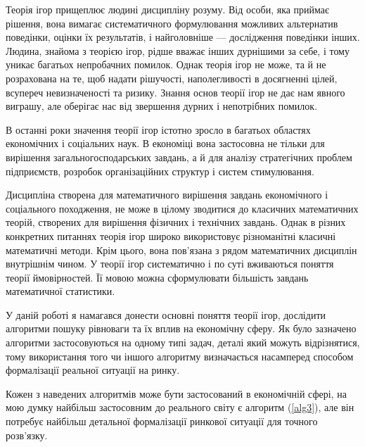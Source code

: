 \documentclass[a4paper]{article}
\begin{document}
Теорія ігор прищеплює людині дисципліну розуму. Від особи, яка приймає рішення, вона вимагає систематичного формулювання можливих альтернатив поведінки, оцінки їх результатів, і найголовніше — дослідження поведінки інших. Людина, знайома з теорією ігор, рідше вважає інших дурнішими за себе, і тому уникає багатьох непробачних помилок. Однак теорія ігор не може, та й не розрахована на те, щоб надати рішучості, наполегливості в досягненні цілей, всупереч невизначеності та ризику. Знання основ теорії ігор не дає нам явного виграшу, але оберігає нас від звершення дурних і непотрібних помилок.

В останні роки значення теорії ігор істотно зросло в багатьох областях економічних і соціальних наук. В економіці вона застосовна не тільки для вирішення загальногосподарських завдань, а й для аналізу стратегічних проблем підприємств, розробок організаційних структур і систем стимулювання.

Дисципліна створена для математичного вирішення завдань економічного і соціального походження, не може в цілому зводитися до класичних математичних теорій, створених для вирішення фізичних і технічних завдань. Однак в різних конкретних питаннях теорія ігор широко використовує різноманітні класичні математичні методи. Крім цього, вона пов'язана з рядом математичних дисциплін внутрішнім чином. У теорії ігор систематично і по суті вживаються поняття теорії ймовірностей. Її мовою можна сформулювати більшість завдань математичної статистики.

У даній роботі я намагався донести основні поняття теорії ігор, дослідити алгоритми пошуку рівноваги та їх вплив на економічну сферу. Як було зазначено алгоритми застосовуються на одному типі задач, деталі який можуть відрізнятися, тому використання того чи іншого алгоритму визначається насамперед способом формалізації реальної ситуації на ринку.

Кожен з наведених алгоритмів може бути застосований в економічній сфері, на мою думку найбільш застосовним до реального світу є алгоритм (\ref{alg3}), але він потребує найбільш детальної формалізації ринкової ситуації для точного розв'язку.
\end{document}
